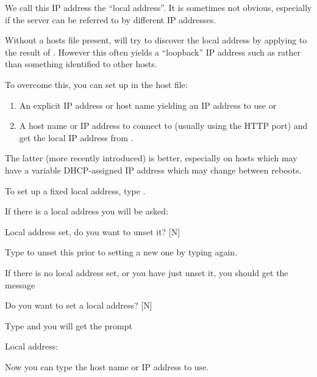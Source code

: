 We call this IP address the ``local address''. It is sometimes not obvious, especially if the
server can be referred to by different IP addresses.

Without a hosts file present, \ProductName{} will try to discover the local
address by applying  to the result
of . However this often yields a ``loopback'' IP address such as
 rather than something identified to other hosts.

To overcome this, you can set up in the host file:

\begin{enumerate}
\item An explicit IP address or host name yielding an IP address to use or
\item A host name or IP address to connect to (usually using the HTTP port) and get the local IP address from
.
\end{enumerate}
The latter (more recently introduced) is better, especially on hosts which may have a variable DHCP-assigned IP address
which may change between reboots.

To set up a fixed local address, type .

If there is a local address you will be asked:

\begin{expara}

Local address set, do you want to unset it? [N]

\end{expara}

Type  to unset this prior to setting a new one by typing  again.

If there is no local address set, or you have just unset it, you should get the message

\begin{expara}

Do you want to set a local address? [N]

\end{expara}

Type  and you will get the prompt

\begin{expara}

Local address:

\end{expara}

Now you can type the host name or IP address to use.

